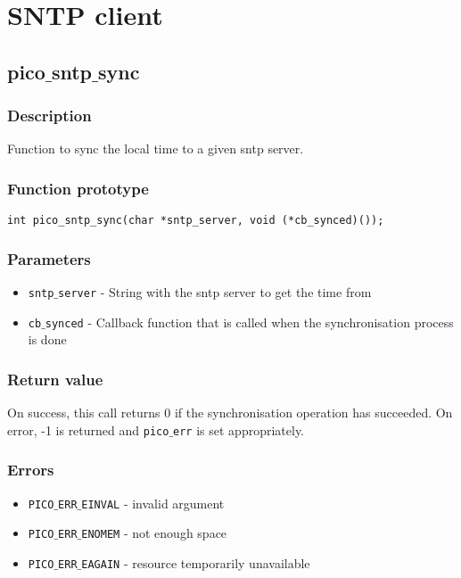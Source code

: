 \section{SNTP client}



\subsection{pico$\_$sntp$\_$sync}

\subsubsection*{Description}
Function to sync the local time to a given sntp server.
\subsubsection*{Function prototype}
\begin{verbatim}
int pico_sntp_sync(char *sntp_server, void (*cb_synced)());
\end{verbatim}

\subsubsection*{Parameters}
\begin{itemize}[noitemsep]
\item \texttt{sntp$\_$server} - String with the sntp server to get the time from
\item \texttt{cb$\_$synced} - Callback function that is called when the synchronisation process is done
\end{itemize}

\subsubsection*{Return value}
On success, this call returns 0 if the synchronisation operation has succeeded.
On error, -1 is returned and \texttt{pico$\_$err} is set appropriately.

\subsubsection*{Errors}
\begin{itemize}[noitemsep]
\item \texttt{PICO$\_$ERR$\_$EINVAL} - invalid argument
\item \texttt{PICO$\_$ERR$\_$ENOMEM} - not enough space
\item \texttt{PICO$\_$ERR$\_$EAGAIN} - resource temporarily unavailable
\end{itemize}

